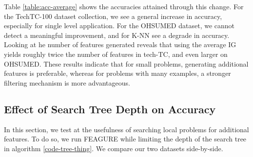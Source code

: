 \documentclass[twoside,11pt]{article}
\theoremstyle{definition}
\begin{document}
Table \ref{table:acc-average} shows the accuracies attained through this change. For the TechTC-100 dataset collection, we see a general increase in accuracy, especially for single level application. For the OHSUMED dataset, we cannot detect a meaningful improvement, and for K-NN see a degrade in accuracy. 
Looking at he number of features generated reveals that using the average IG yields roughly twice the number of features in tech-TC, and even larger on OHSUMED. 
These results indicate that for small problems, generating additional features is preferable, whereas for problems with many examples, a stronger filtering mechanism is more advantageous. 


\subsection{Effect of Search Tree Depth on Accuracy}

In this section, we test at the usefulness of searching local problems for additional features.
To do so, we run FEAGURE while limiting the depth of the search tree in algorithm \ref{code-tree-thing}. 
We compare our two datasets side-by-side.
\end{document}

